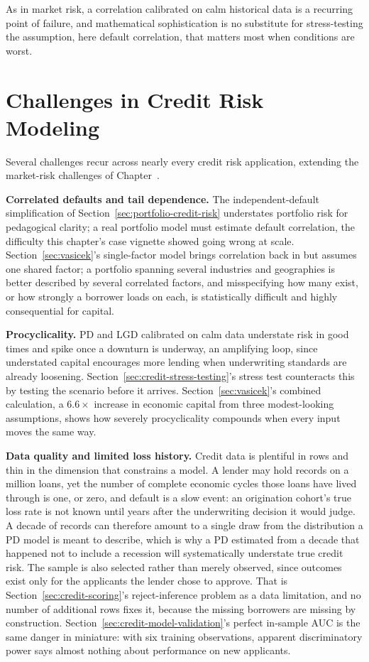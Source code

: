 \documentclass[../ai_in_finance]{subfiles}
\begin{document}
As in market risk, a correlation calibrated on calm historical data is a recurring point of failure, and mathematical sophistication is no substitute for stress-testing the assumption, here default correlation, that matters most when conditions are worst.

\section{Challenges in Credit Risk Modeling}

Several challenges recur across nearly every credit risk application, extending the market-risk challenges of Chapter~.

\textbf{Correlated defaults and tail dependence.} The independent-default simplification of Section~\ref{sec:portfolio-credit-risk} understates portfolio risk for pedagogical clarity; a real portfolio model must estimate default correlation, the difficulty this chapter's case vignette showed going wrong at scale.
Section~\ref{sec:vasicek}'s single-factor model brings correlation back in but assumes one shared factor; a portfolio spanning several industries and geographies is better described by several correlated factors, and misspecifying how many exist, or how strongly a borrower loads on each, is statistically difficult and highly consequential for capital.

\textbf{Procyclicality.} PD and LGD calibrated on calm data understate risk in good times and spike once a downturn is underway, an amplifying loop, since understated capital encourages more lending when underwriting standards are already loosening. Section~\ref{sec:credit-stress-testing}'s stress test counteracts this by testing the scenario before it arrives.
Section~\ref{sec:vasicek}'s combined calculation, a $6.6\times$ increase in economic capital from three modest-looking assumptions, shows how severely procyclicality compounds when every input moves the same way.

\textbf{Data quality and limited loss history.} Credit data is plentiful in rows and thin in the dimension that constrains a model. A lender may hold records on a million loans, yet the number of complete economic cycles those loans have lived through is one, or zero, and default is a slow event: an origination cohort's true loss rate is not known until years after the underwriting decision it would judge. A decade of records can therefore amount to a single draw from the distribution a PD model is meant to describe, which is why a PD estimated from a decade that happened not to include a recession will systematically understate true credit risk.
The sample is also selected rather than merely observed, since outcomes exist only for the applicants the lender chose to approve. That is Section~\ref{sec:credit-scoring}'s reject-inference problem as a data limitation, and no number of additional rows fixes it, because the missing borrowers are missing by construction. Section~\ref{sec:credit-model-validation}'s perfect in-sample AUC is the same danger in miniature: with six training observations, apparent discriminatory power says almost nothing about performance on new applicants.
\end{document}
